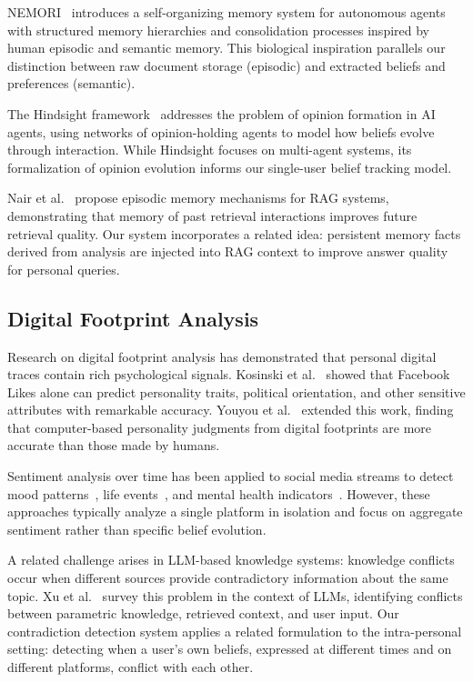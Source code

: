 \documentclass[manuscript,review]{acmart}
\begin{document}
NEMORI~\cite{yang2025nemori} introduces a self-organizing memory system for autonomous agents with structured memory hierarchies and consolidation processes inspired by human episodic and semantic memory.
This biological inspiration parallels our distinction between raw document storage (episodic) and extracted beliefs and preferences (semantic).

The Hindsight framework~\cite{zhang2024hindsight} addresses the problem of opinion formation in AI agents, using networks of opinion-holding agents to model how beliefs evolve through interaction.
While Hindsight focuses on multi-agent systems, its formalization of opinion evolution informs our single-user belief tracking model.

Nair et al.~\cite{nair2025episodic} propose episodic memory mechanisms for RAG systems, demonstrating that memory of past retrieval interactions improves future retrieval quality.
Our system incorporates a related idea: persistent memory facts derived from analysis are injected into RAG context to improve answer quality for personal queries.

\subsection{Digital Footprint Analysis}
\label{sec:related-footprint}

Research on digital footprint analysis has demonstrated that personal digital traces contain rich psychological signals.
Kosinski et al.~\cite{kosinski2013private} showed that Facebook Likes alone can predict personality traits, political orientation, and other sensitive attributes with remarkable accuracy.
Youyou et al.~\cite{youyou2015computer} extended this work, finding that computer-based personality judgments from digital footprints are more accurate than those made by humans.

Sentiment analysis over time has been applied to social media streams to detect mood patterns~\cite{thelwall2012sentiment,golder2011diurnal}, life events~\cite{li2014major}, and mental health indicators~\cite{de2013social}.
However, these approaches typically analyze a single platform in isolation and focus on aggregate sentiment rather than specific belief evolution.

A related challenge arises in LLM-based knowledge systems: knowledge conflicts~\cite{xu2024knowledge} occur when different sources provide contradictory information about the same topic.
Xu et al.~\cite{xu2024knowledge} survey this problem in the context of LLMs, identifying conflicts between parametric knowledge, retrieved context, and user input.
Our contradiction detection system applies a related formulation to the intra-personal setting: detecting when a user's own beliefs, expressed at different times and on different platforms, conflict with each other.
\end{document}
